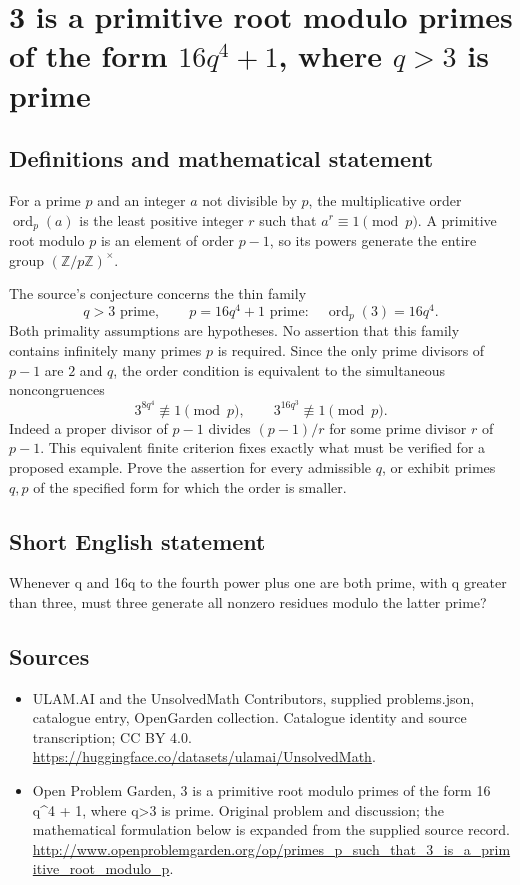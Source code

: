 \documentclass[11pt,a4paper]{article}
\begin{document}
\section*{3 is a primitive root modulo primes of the form $16q^4+1$, where $q>3$ is prime}\label{statement}

\subsection{Definitions and mathematical statement}
For a prime $p$ and an integer $a$ not divisible by $p$, the
multiplicative order $\operatorname{ord}_p(a)$ is the least positive
integer $r$ such that $a^r\equiv1\pmod p$. A primitive root modulo
$p$ is an element of order $p-1$, so its powers generate the entire
group $(\mathbb Z/p\mathbb Z)^\times$.

The source's conjecture concerns the thin family
\[
 q>3\text{ prime},\qquad p=16q^4+1\text{ prime}:
               \quad \operatorname{ord}_p(3)=16q^4.
\]
Both primality assumptions are hypotheses. No assertion that this
family contains infinitely many primes $p$ is required. Since the only
prime divisors of $p-1$ are $2$ and $q$, the order condition is
equivalent to the simultaneous noncongruences
\[
 3^{8q^4}\not\equiv1\pmod p,
 \qquad 3^{16q^3}\not\equiv1\pmod p.
\]
Indeed a proper divisor of $p-1$ divides $(p-1)/r$ for some prime
divisor $r$ of $p-1$. This equivalent finite criterion fixes exactly
what must be verified for a proposed example. Prove the assertion for
every admissible $q$, or exhibit primes $q,p$ of the specified form
for which the order is smaller.
\subsection{Short English statement}
Whenever q and 16q to the fourth power plus one are both prime, with q greater than three, must three generate all nonzero residues modulo the latter prime?
\subsection{Sources}
\begin{itemize}
\item[S1] ULAM.AI and the UnsolvedMath Contributors, supplied problems.json, catalogue entry, OpenGarden collection. Catalogue identity and source transcription; CC BY 4.0.
\url{https://huggingface.co/datasets/ulamai/UnsolvedMath}.
\item[S2] Open Problem Garden, 3 is a primitive root modulo primes of the form 16 q\textasciicircum{}4 + 1, where q>3 is prime. Original problem and discussion; the mathematical formulation below is expanded from the supplied source record.
\url{http://www.openproblemgarden.org/op/primes_p_such_that_3_is_a_primitive_root_modulo_p}.
\end{itemize}
\end{document}
